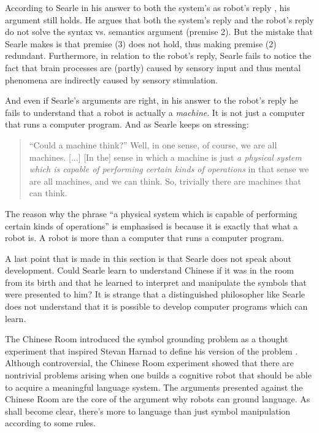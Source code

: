 According to Searle in his answer to both the system's as robot's reply \citep{searle:1984}, his argument still holds. He argues that both the system's reply and the robot's reply do not solve the syntax vs. semantics argument (premise 2). But the mistake that Searle makes is that premise (3) does not hold, thus making premise (2) redundant. Furthermore, in relation to the robot's reply, Searle fails to notice the fact that brain processes are (partly) caused by sensory input and thus mental phenomena are indirectly caused by sensory stimulation.

And even if Searle's arguments are right, in his answer to the robot's reply he fails to understand that a robot is actually a {\em machine}. It is not just a computer that runs a computer program. And as Searle keeps on stressing:

\begin{quote}
``Could a machine think?'' Well, in one sense, of course, we are all machines. [...] [In the] sense in which a machine is just \emph{a physical system which is capable of performing certain kinds of operations} in that sense we are all machines, and we can think. So, trivially there are machines that can think. \citep[35, my italics]{searle:1984}
\end{quote}

The reason why the phrase ``a physical system which is capable of performing certain kinds of operations'' is emphasised is because it is exactly that what a robot is. A robot is more than a computer that runs a computer program.

A last point that is made in this section is that Searle does not speak about development. Could Searle learn to understand Chinese if it was in the room from its birth and that he learned to interpret and manipulate the symbols that were presented to him? It is strange that a distinguished philosopher like Searle does not understand that it is possible to develop computer programs which can learn.

\bigskip\noindent{}The Chinese Room introduced the symbol grounding problem as a thought experiment that inspired Stevan Harnad to define his version of the problem \citep{harnad:1990}. Although controversial, the Chinese Room experiment showed that there are nontrivial problems arising when one builds a cognitive robot that should be able to acquire a meaningful language system. The arguments presented against the Chinese Room are the core of the argument why robots can ground language. As shall become clear, there's more to language than just symbol manipulation according to some rules.

